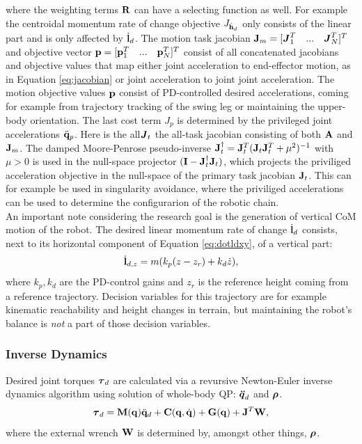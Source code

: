where the weighting terms $\mathbf{R}$ can have a selecting function as well. For example the centroidal momentum rate of change objective $J_{\dot{\mathbf{h}}_d}$ only consists of the linear part and is only affected by $\dot{\mathbf{l}}_d$. The motion task jacobian $\mathbf{J}_m = [\boldsymbol{J}_1^T\quad...\quad\boldsymbol{J}_N^T]^T$ and objective vector $\mathbf{p} = [\mathbf{p}_1^T\quad...\quad\mathbf{p}_N^T]^T$ consist of all concatenated jacobians and objective values that map either joint acceleration to end-effector motion, as in Equation \eqref{eq:jacobian} or joint acceleration to joint joint acceleration. The motion objective values $\mathbf{p}$ consist of PD-controlled desired accelerations, coming for example from trajectory tracking of the swing leg or maintaining the upper-body orientation. The last cost term $J_p$ is determined by the privileged joint accelerations $\ddot{\mathbf{q}}_p$. Here is the all$\boldsymbol{J}_t$ the all-task jacobian consisting of both $\mathbf{A}$ and $\mathbf{J}_m$. The damped Moore-Penrose pseudo-inverse  $\mathbf{J}_t^{\dagger} = \mathbf{J}_t^T(\mathbf{J}_t\mathbf{J}_t^T +\mu^2)^{-1}$ with $\mu>0$ is used in the null-space projector $(\mathbf{I} - \mathbf{J}_t^{\dagger}\mathbf{J}_t)$, which projects the priviliged acceleration objective in the null-space of the primary task jacobian $\mathbf{J}_t$. This can for example be used in singularity avoidance, where the priviliged accelerations can be used to determine the configurarion of the robotic chain.  \\
An important note considering the research goal is the generation of vertical \ac{CoM} motion of the robot. The desired linear momentum rate of change $\dot{\mathbf{l}}_d$ consists, next to its horizontal component of Equation \eqref{eq:dotldxy}, of a vertical part:
\begin{equation}
\dot{\mathbf{l}}_{d,z} =m(k_p(z-z_r) + k_d\dot{z}), 
\end{equation}
where $k_p, k_d$ are the PD-control gains and $z_r$ is the reference height coming from a reference trajectory. Decision variables for this trajectory are for example kinematic reachability and height changes in terrain, but maintaining the robot's balance is \textit{not } a part of those decision variables.


\subsubsection{Inverse Dynamics}
Desired joint torques $\boldsymbol{\tau}_d$ are calculated via a revursive Newton-Euler inverse dynamics algorithm using solution of whole-body \ac{QP}: $\boldsymbol{\ddot{q}}_d$ and $\boldsymbol{\rho}$.
\begin{equation}
    \boldsymbol{\tau}_d = \mathbf{M}(\mathbf{q})\ddot{\mathbf{q}}_d + \mathbf{C}(\mathbf{q},\dot{\mathbf{q}}) + \mathbf{G}(\mathbf{q}) + \mathbf{J}^T \mathbf{W},
\end{equation}
where the external wrench $\mathbf{W}$ is determined by, amongst other things, $\boldsymbol{\rho}$.

